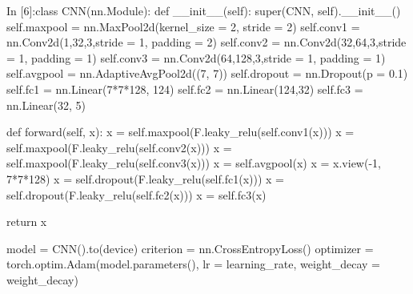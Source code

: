 \documentclass[12pt, a4paper]{article}
\begin{document}
\begin{python}
In [6]:class CNN(nn.Module):
          def __init__(self):
            super(CNN, self).__init__()
            self.maxpool = nn.MaxPool2d(kernel_size = 2, stride = 2)
            self.conv1 = nn.Conv2d(1,32,3,stride = 1, padding = 2)
            self.conv2 = nn.Conv2d(32,64,3,stride = 1, padding = 1)
            self.conv3 = nn.Conv2d(64,128,3,stride = 1, padding = 1)
            self.avgpool = nn.AdaptiveAvgPool2d((7, 7))
            self.dropout = nn.Dropout(p = 0.1)
            self.fc1 = nn.Linear(7*7*128, 124)
            self.fc2 = nn.Linear(124,32)
            self.fc3 = nn.Linear(32, 5)

            
          def forward(self, x):
            x = self.maxpool(F.leaky_relu(self.conv1(x)))
            x = self.maxpool(F.leaky_relu(self.conv2(x)))
            x = self.maxpool(F.leaky_relu(self.conv3(x)))
            x = self.avgpool(x)
            x = x.view(-1, 7*7*128)
            x = self.dropout(F.leaky_relu(self.fc1(x)))
            x = self.dropout(F.leaky_relu(self.fc2(x)))
            x = self.fc3(x)
        
            return x
        
        model = CNN().to(device)
        criterion = nn.CrossEntropyLoss()
        optimizer = torch.optim.Adam(model.parameters(), lr = learning_rate, weight_decay = weight_decay)
\end{python}
\end{document}
